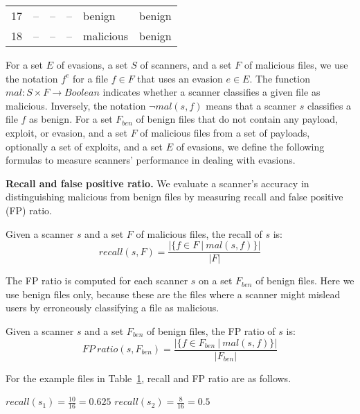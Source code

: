 \begin{table}[tb]
\begin{tabular}{rlllll}
17   &   --      &   --   &   --   &   benign   & benign    \\
18   &   --      &   --   &   --   &   malicious   & benign    \\

\bottomrule
\end{tabular}
\label{t:example suite}
\end{table}

For a  set $E$ of evasions, a set $S$ of scanners, and a set $F$ of malicious files, 
we use the notation $f^e$ for a file $f \in F$ that uses an evasion $e \in E$.
The function $\mathit{mal}: S \times F \rightarrow \mathit{Boolean}$  indicates whether a scanner classifies a given file as malicious.
Inversely, the notation $\neg \mathit{mal}(s,f)$ means that a scanner $s$ classifies a file $f$ as benign.
For a set $F_{ben}$ of benign files that do not contain any payload, exploit, or evasion, and a set $F$ of malicious files from a set of payloads,
optionally a set of exploits,
and a set $E$ of evasions,
we define the following formulas to measure scanners' performance in dealing with evasions.

\textbf{Recall and false positive ratio.}
We evaluate a scanner's accuracy in distinguishing malicious from benign files by measuring recall and false positive (FP) ratio.

\begin{definition}[Recall]
Given a scanner $s$ and a set $F$ of malicious files, the recall of $s$ is:
$$
\mathit{recall}(s, F) = \frac{|\{ f \in F ~|~ \mathit{mal}(s,f) \}|}{|F|}
$$
\label{def: recall}
\end{definition}
%
The FP ratio is computed for each scanner $s$ on a set $F_{ben}$ of benign files.
Here we use benign files only, because these are the files where a scanner might mislead users by erroneously classifying a file as malicious.
%
\begin{definition}[FP ratio]
Given a scanner $s$ and a set $F_{ben}$ of benign files, the FP ratio of $s$ is:
$$
\mathit{FP~ratio}(s, F_{ben}) = \frac{|\{ f \in F_{ben} ~|~ \mathit{mal}(s,f) \}|}{|F_{ben}|}
$$
\label{def: fp ratio}
\end{definition}

For the example files in Table~\ref{t:example suite}, recall and FP ratio are as follows.

\vspace{.5em}
{
\centering
$recall(s_1) = \frac{10}{16} = 0.625$ \hspace{2em} $recall(s_2) = \frac{8}{16} = 0.5$ \\
}
\vspace{.5em}

